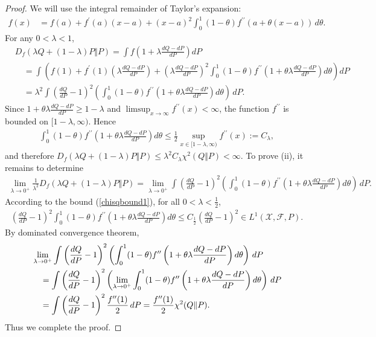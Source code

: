 \documentclass{article}
\numberwithin{equation}{section}
\renewcommand{\cal}{\mathcal}
\theoremstyle{plain}
\theoremstyle{definition}
\begin{document}
\begin{proof}
We will use the integral remainder of Taylor's expansion:
\begin{align*}
	f(x)&=f(a)+f^\prime(a)(x-a)+(x-a)^2\int_0^1(1-\theta)f^{\prime\prime}(a+\theta(x-a))\,d\theta.
\end{align*}
For any $0<\lambda<1$,
\begin{align*}
	&D_f(\lambda Q+(1-\lambda)P\Vert P)=\int f\left(1+\lambda\frac{dQ-dP}{dP}\right)dP\\
	&\quad=\int\left(f(1)+f^\prime(1)\left(\lambda\frac{dQ-dP}{dP}\right)+\left(\lambda\frac{dQ-dP}{dP}\right)^2\int_0^1(1-\theta)f^{\prime\prime}\left(1+\theta\lambda\frac{dQ-dP}{dP}\right)d\theta\right)dP\\
	&\quad=\lambda^2\int\left(\frac{dQ}{dP}-1\right)^2\left(\int_0^1(1-\theta)f^{\prime\prime}\left(1+\theta\lambda\frac{dQ-dP}{dP}\right)d\theta\right)\,dP.
\end{align*}
Since $1+\theta\lambda\frac{dQ-dP}{dP}\geq 1-\lambda$ and $\limsup_{x\to\infty}f^{\prime\prime}(x)<\infty$, the function $f^{\prime\prime}$ is bounded on $[1-\lambda,\infty)$. Hence
\begin{align}
	\int_0^1(1-\theta)f^{\prime\prime}\left(1+\theta\lambda\frac{dQ-dP}{dP}\right)d\theta\leq\frac{1}{2}\sup_{x\in[1-\lambda,\infty)}f^{\prime\prime}(x):=C_\lambda,\label{chisqbound1}
\end{align}
and therefore $D_f(\lambda Q+(1-\lambda)P\Vert P)\leq\lambda^2C_\lambda\chi^2(Q\Vert P)<\infty$. To prove (ii), it remains to determine
\begin{align*}
	\lim_{\lambda\to 0^+}\frac{1}{\lambda^2}D_f(\lambda Q+(1-\lambda)P\Vert P)=\lim_{\lambda\to 0^+}\int\left(\frac{dQ}{dP}-1\right)^2\left(\int_0^1(1-\theta)f^{\prime\prime}\left(1+\theta\lambda\frac{dQ-dP}{dP}\right)d\theta\right)\,dP.
\end{align*}
According to the bound (\ref{chisqbound1}), for all $0<\lambda<\frac{1}{2}$,
\begin{align*}
	\left(\frac{dQ}{dP}-1\right)^2\int_0^1(1-\theta)f^{\prime\prime}\left(1+\theta\lambda\frac{dQ-dP}{dP}\right)d\theta\leq C_{\frac{1}{2}}\left(\frac{dQ}{dP}-1\right)^2\in L^1(\cal{X},\mathscr{F},P).
\end{align*}
By dominated convergence theorem,
\begin{align}
	&\lim_{\lambda\to 0^+}\int\left(\frac{dQ}{dP}-1\right)^2\left(\int_0^1(1-\theta)f^{\prime\prime}\left(1+\theta\lambda\frac{dQ-dP}{dP}\right)d\theta\right)\,dP\notag\\
	&\quad =\int\left(\frac{dQ}{dP}-1\right)^2\left(\lim_{\lambda\to 0^+}\int_0^1(1-\theta)f^{\prime\prime}\left(1+\theta\lambda\frac{dQ-dP}{dP}\right)d\theta\right)\,dP\label{chisqdominate}\\
	&\quad =\int\left(\frac{dQ}{dP}-1\right)^2\frac{f^{\prime\prime}(1)}{2}\,dP=\frac{f^{\prime\prime}(1)}{2}\chi^2(Q\Vert P)\notag.
\end{align}
Thus we complete the proof.
\end{proof}
\end{document}
